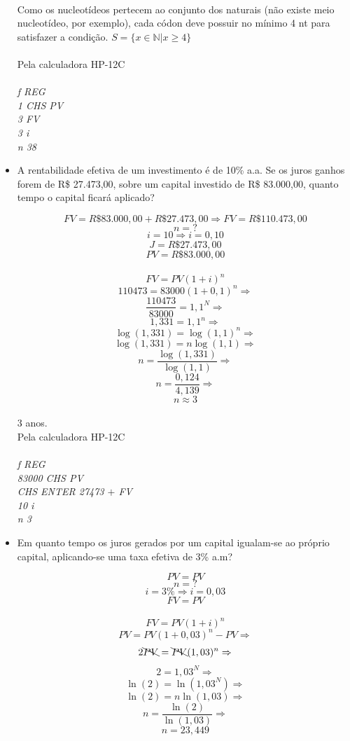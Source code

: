 \documentclass[a4paper, 12pt]{article}
\begin{document}
\begin{itemize}
\\
Como os nucleotídeos pertecem ao conjunto dos naturais (não existe meio nucleotídeo, por exemplo), cada códon deve possuir no mínimo 4 nt para satisfazer a condição. $S=\{x \in \mathbb{N} | x \geq 4 \}$ \\\\

Pela calculadora HP-12C\\\\
\emph{f REG}\\
\emph{1 CHS PV}\\
\emph{3 FV}\\
\emph{3 i}\\
\emph{n 38}  

\item  A rentabilidade efetiva de um investimento é de 10\% a.a. Se os juros 
ganhos forem de R\$ 27.473,00, sobre um capital investido de R\$ 83.000,00, 
quanto tempo o capital ficará aplicado?

$$ FV = R\$83.000,00 +  R\$27.473,00 \Rightarrow FV = R\$110.473,00  $$
$$ n = ? $$
$$ i = 10 \Rightarrow i = 0,10 $$
$$ J = R\$27.473,00 $$
$$ PV = R\$83.000,00 $$
\\
$$ FV = PV(1+i)^n $$
$$ 110473 = 83000(1+0,1)^{n} \Rightarrow $$
$$ \frac{110473}{83000} = 1,1^N \Rightarrow $$
$$ 1,331 = 1,1^{n} \Rightarrow $$
$$ \log(1,331) = \log(1,1)^{n} \Rightarrow $$
$$ \log(1,331) = n \log(1,1) \Rightarrow $$
$$ n  = \frac{\log(1,331)}{\log(1,1)} \Rightarrow $$
$$ n  = \frac{0,124}{4,139} \Rightarrow $$
$$ \boxed{n  \approx 3} $$
\\

3 anos. \\

Pela calculadora HP-12C\\\\
\emph{f REG}\\
\emph{83000 CHS PV}\\
\emph{CHS ENTER 27473 $+$ FV}\\
\emph{10 i}\\
\emph{n 3}  

\item Em quanto tempo os juros gerados por um capital igualam-se ao próprio 
capital, aplicando-se uma taxa efetiva de 3\% a.m?
  
$$ PV = PV  $$
$$ n = ? $$
$$ i = 3 \% \Rightarrow i = 0,03 $$
$$ FV = PV $$
\\
$$ FV = PV(1+i)^n $$
$$ PV = PV(1+0,03)^n - PV \Rightarrow $$
$$ 2 \bcancel{PV} = \bcancel{PV}(1,03)^{n} \Rightarrow $$
$$ 2 = 1,03^N \Rightarrow $$
$$ \ln(2) = \ln(1,03^N) \Rightarrow $$
$$ \ln(2) = n \ln(1,03) \Rightarrow $$
$$ n = \frac{\ln(2)}{\ln(1,03)} \Rightarrow $$
$$ \boxed{n = 23,449} $$


\end{itemize}
\end{document}
